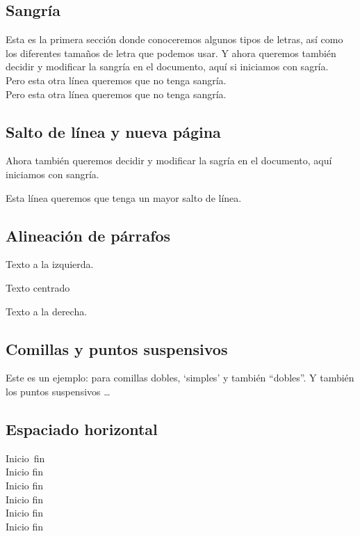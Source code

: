 \documentclass[12pt]{article}
\begin{document}
\subsection{Sangría}
Esta es la primera sección donde conoceremos algunos
tipos de letras, así como los diferentes tamaños de 
letra que podemos usar. Y ahora queremos también decidir
y modificar la sangría en el documento, aquí si iniciamos
con sagría.\\
\noindent Pero esta otra línea queremos que no tenga sangría.\\
Pero esta otra línea queremos que no tenga sangría.\\

\subsection{Salto de línea y nueva página}
Ahora también queremos decidir y modificar la sagría en el 
documento, aquí iniciamos con sangría.\\[2mm]
\par
Esta línea queremos que tenga un mayor salto de línea.

\subsection{Alineación de párrafos}
\begin{flushleft}
	Texto a la izquierda.
\end{flushleft}

\begin{center}
	Texto centrado
\end{center}

\begin{flushright}
	Texto a la derecha.
\end{flushright}

\subsection{Comillas y puntos suspensivos}
Este es un ejemplo: para comillas dobles,
`simples' y también ``dobles''. Y también los
puntos suspensivos \dots

\subsection{Espaciado horizontal}
Inicio \,fin \\[2mm]
Inicio \quad fin \\[2mm]
Inicio \qquad fin \\[2mm]
Inicio \hspace{3cm} fin \\[2mm]
Inicio \hspace{5cm} fin \\[2mm]
Inicio \hfill fin \\[2mm]
\end{document}
